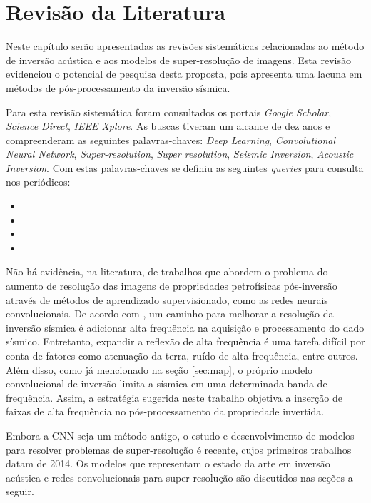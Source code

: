 \chapter{Revisão da Literatura}
\label{cap:3revisaoliteraria}

Neste capítulo serão apresentadas as revisões sistemáticas relacionadas
ao método de inversão acústica e aos modelos de super-resolução de imagens.
Esta revisão evidenciou o potencial de pesquisa desta proposta, pois
apresenta uma lacuna em métodos de pós-processamento da inversão sísmica.

Para esta revisão sistemática foram consultados os portais \textit{Google Scholar}, \textit{Science Direct}, \textit{IEEE Xplore}.
As buscas tiveram um alcance de dez anos e compreenderam as seguintes palavras-chaves: \textit{Deep Learning},
\textit{Convolutional Neural Network}, \textit{Super-resolution}, \textit{Super resolution}, \textit{Seismic Inversion},
\textit{Acoustic Inversion}. Com estas palavras-chaves se definiu as seguintes \textit{queries} para consulta nos periódicos:

\begin{itemize}
 \item 
 \item
 \item
 \item
\end{itemize}

Não há evidência, na literatura, de trabalhos que abordem o problema do aumento de resolução
das imagens de propriedades petrofísicas pós-inversão através de métodos de aprendizado supervisionado,
como as redes neurais convolucionais. De acordo com \cite{Xiaoyu2012}, um caminho
para melhorar a resolução da inversão sísmica é adicionar alta frequência
na aquisição e processamento do dado sísmico. Entretanto, expandir a reflexão de alta frequência é uma tarefa
difícil por conta de fatores como atenuação da terra, ruído de alta frequência, 
entre outros. Além disso, como já mencionado na seção \ref{sec:map}, o próprio modelo convolucional de inversão
limita a sísmica em uma determinada banda de frequência. Assim, a estratégia sugerida neste trabalho
objetiva a inserção de faixas de alta frequência no pós-processamento da propriedade invertida.

Embora a CNN seja um método antigo, o estudo e desenvolvimento de modelos para resolver problemas de super-resolução
é recente, cujos primeiros trabalhos datam de 2014. Os modelos que representam o estado da arte
em inversão acústica e redes convolucionais para super-resolução são discutidos nas seções a seguir.

